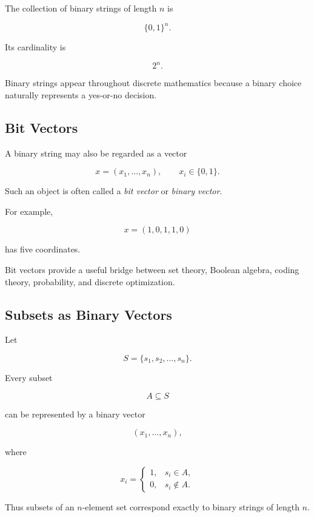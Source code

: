 The collection of binary strings of length \(n\) is

\[
\boxed{
\{0,1\}^n.
}
\]

Its cardinality is

\[
\boxed{
2^n.
}
\]

Binary strings appear throughout discrete mathematics because a binary
choice naturally represents a yes-or-no decision.

\subsection{Bit Vectors}
\label{subsec:bit-vectors}

A binary string may also be regarded as a vector

\[
\boxed{
x=(x_1,\ldots,x_n),
\qquad
x_i\in\{0,1\}.
}
\]

Such an object is often called a \emph{bit vector} or \emph{binary
vector}.

For example,

\[
x=(1,0,1,1,0)
\]

has five coordinates.

Bit vectors provide a useful bridge between set theory, Boolean
algebra, coding theory, probability, and discrete optimization.

\subsection{Subsets as Binary Vectors}
\label{subsec:subsets-binary-vectors}

Let

\[
S=\{s_1,s_2,\ldots,s_n\}.
\]

Every subset

\[
A\subseteq S
\]

can be represented by a binary vector

\[
(x_1,\ldots,x_n),
\]

where

\[
x_i=
\begin{cases}
1,&s_i\in A,\\
0,&s_i\notin A.
\end{cases}
\]

Thus subsets of an \(n\)-element set correspond exactly to binary
strings of length \(n\).


